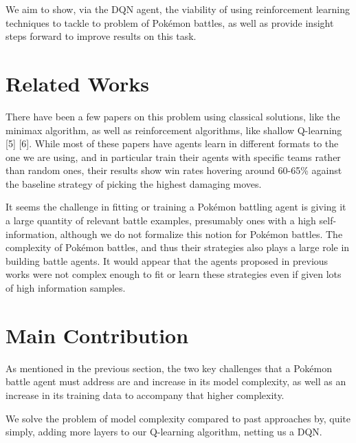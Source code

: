 \documentclass{article}
\begin{document}
We aim to show, via the DQN agent, the viability of using reinforcement learning techniques to tackle to problem of Pokémon battles, as well as provide insight steps forward to improve results on this task.

\section{Related Works}
There have been a few papers on this problem using classical solutions, like the minimax algorithm, as well as reinforcement algorithms, like shallow Q-learning [5] [6]. While most of these papers have agents learn in different formats to the one we are using, and in particular train their agents with specific teams rather than random ones, their results show win rates hovering around 60-65\% against the baseline strategy of picking the highest damaging moves.

It seems the challenge in fitting or training a Pokémon battling agent is giving it a large quantity of relevant battle examples, presumably ones with a high self-information, although we do not formalize this notion for Pokémon battles. The complexity of Pokémon battles, and thus their strategies also plays a large role in building battle agents. It would appear that the agents proposed in previous works were not complex enough to fit or learn these strategies even if given lots of high information samples. 

\section{Main Contribution}
As mentioned in the previous section, the two key challenges that a Pokémon battle agent must address are and increase in its model complexity, as well as an increase in its training data to accompany that higher complexity.

We solve the problem of model complexity compared to past approaches by, quite simply, adding more layers to our Q-learning algorithm, netting us a DQN.
\end{document}
